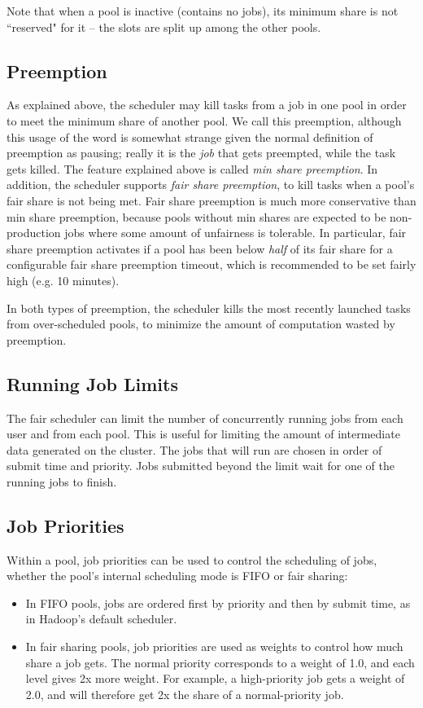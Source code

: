 \documentclass[11pt]{article}
\begin{document}
Note that when a pool is inactive (contains no jobs), its minimum share is not ``reserved" for it -- the slots are split up among the other pools.

\subsection{Preemption}

As explained above, the scheduler may kill tasks from a job in one pool in order to meet the minimum share of another pool. We call this preemption, although this usage of the word is somewhat strange given the normal definition of preemption as pausing; really it is the \emph{job} that gets preempted, while the task gets killed. The feature explained above is called \emph{min share preemption}. In addition, the scheduler supports \emph{fair share preemption}, to kill tasks when a pool's fair share is not being met. Fair share preemption is much more conservative than min share preemption, because pools without min shares are expected to be non-production jobs where some amount of unfairness is tolerable. In particular, fair share preemption activates if a pool has been below \emph{half} of its fair share for a configurable fair share preemption timeout, which is recommended to be set fairly high (e.g. 10 minutes).

In both types of preemption, the scheduler kills the most recently launched tasks from over-scheduled pools, to minimize the amount of computation wasted by preemption.

\subsection{Running Job Limits}

The fair scheduler can limit the number of concurrently running jobs from each user and from each pool. This is useful for limiting the amount of intermediate data generated on the cluster. The jobs that will run are chosen in order of submit time and priority. Jobs submitted beyond the limit wait for one of the running jobs to finish.

\subsection{Job Priorities}

Within a pool, job priorities can be used to control the scheduling of jobs, whether the pool's internal scheduling mode is FIFO or fair sharing:
\begin{itemize}
  \item In FIFO pools, jobs are ordered first by priority and then by submit time, as in Hadoop's default scheduler.
  \item In fair sharing pools, job priorities are used as weights to control how much share a job gets. The normal priority corresponds to a weight of 1.0, and each level gives 2x more weight. For example, a high-priority job gets a weight of 2.0, and will therefore get 2x the share of a normal-priority job. 
\end{itemize}
\end{document}
